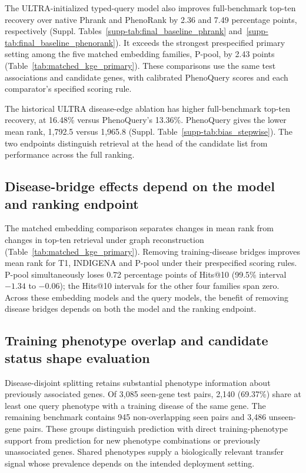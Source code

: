 \documentclass[webpdf,contemporary,large]{oup-authoring-template}%
\theoremstyle{thmstyleone}%
\theoremstyle{thmstyletwo}%
\theoremstyle{thmstylethree}%
\begin{document}


The ULTRA-initialized typed-query model also improves full-benchmark top-ten
recovery over native Phrank and PhenoRank by 2.36 and 7.49 percentage points,
respectively (Suppl. Tables~\ref{supp-tab:final_baseline_phrank}
and~\ref{supp-tab:final_baseline_phenorank}). It exceeds the strongest
prespecified primary setting among the five matched embedding families,
P-pool, by 2.43 points (Table~\ref{tab:matched_kge_primary}). These comparisons
use the same test associations and candidate genes, with calibrated PhenoQuery
scores and each comparator's specified scoring rule.

The historical ULTRA disease-edge ablation has higher full-benchmark top-ten
recovery, at 16.48\% versus PhenoQuery's 13.36\%. PhenoQuery gives the lower
mean rank, 1{,}792.5 versus 1{,}965.8
(Suppl. Table~\ref{supp-tab:bias_stepwise}). The two endpoints distinguish
retrieval at the head of the candidate list from performance across the full
ranking.

\subsection{Disease-bridge effects depend on the model and ranking endpoint}

The matched embedding comparison separates changes in mean rank from changes
in top-ten retrieval under graph reconstruction (Table~\ref{tab:matched_kge_primary}).
Removing training-disease bridges improves mean rank for T1, INDIGENA and
P-pool under their prespecified scoring rules. P-pool simultaneously loses
0.72 percentage points of Hits@10 (99.5\% interval $-1.34$ to $-0.06$);
the Hits@10 intervals for the other four families span zero. Across these
embedding models and the query models, the benefit of removing disease
bridges depends on both the model and the ranking endpoint.



\subsection{Training phenotype overlap and candidate status shape evaluation}
\label{sec:stepwise_bias_results}

Disease-disjoint splitting retains substantial phenotype information about
previously associated genes. Of 3{,}085 seen-gene test pairs, 2{,}140
(69.37\%) share at least one query phenotype with a training disease of the
same gene. The remaining benchmark contains 945 non-overlapping seen pairs
and 3{,}486 unseen-gene pairs. These groups distinguish prediction with direct
training-phenotype support from prediction for new phenotype combinations or
previously unassociated genes. Shared phenotypes supply a biologically relevant
transfer signal whose prevalence depends on the intended deployment setting.
\end{document}
